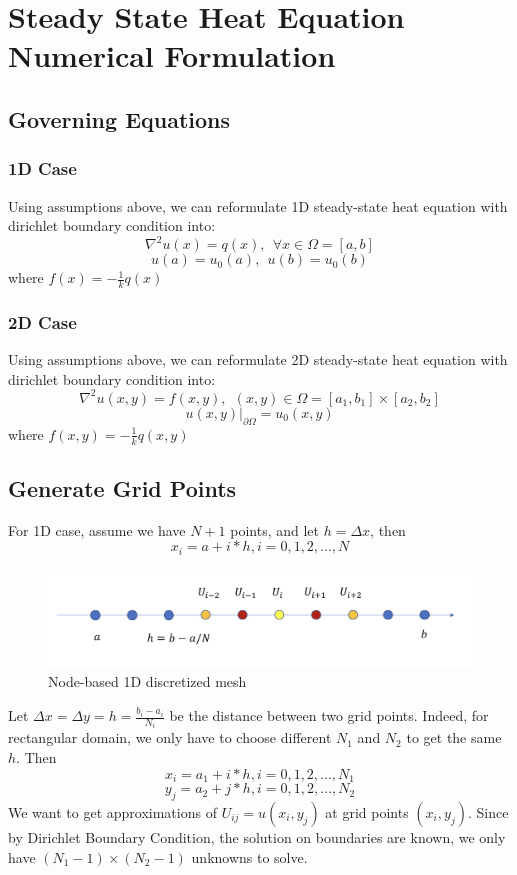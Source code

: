 \documentclass[a4paper]{article}
\begin{document}
\section{Steady State Heat Equation Numerical Formulation}
\subsection{Governing Equations}
\subsubsection{1D Case}
Using assumptions above, we can reformulate 1D steady-state heat equation with dirichlet boundary condition into:
$$\nabla^2u(x) = q(x), ~~\forall x\in \Omega = [a,b]$$
$$u(a) = u_0(a), ~~u(b) = u_0(b) $$
where $f(x) = -\frac{1}{k}q(x)$
\subsubsection{2D Case}
Using assumptions above, we can reformulate 2D steady-state heat equation with dirichlet boundary condition into:
$$\nabla^2u(x,y) = f(x,y), ~~(x,y)\in \Omega = [a_1,b_1] \times [a_2,b_2]$$
$$u(x,y)|_{\partial\Omega} = u_0(x,y)$$
where $f(x,y) = -\frac{1}{k}q(x,y)$

\subsection{Generate Grid Points}
For 1D case, assume we have $N+1$ points, and let $h=\Delta x$, then 
    $$x_i = a + i*h, i = 0,1,2,...,N$$
    
\begin{figure}
\includegraphics[width=1\textwidth]{1d.png}
\caption{\label{1d}Node-based 1D discretized mesh}
\end{figure}

Let $\Delta x = \Delta y = h = \frac{b_i-a_i}{N_i}$ be the distance between two grid points. Indeed, for rectangular domain, we only have to choose different $N_1$ and $N_2$ to get the same $h$. Then
$$x_i = a_1 + i*h, i = 0,1,2,...,N_1$$
$$y_j = a_2 + j*h, i = 0,1,2,...,N_2$$
We want to get approximations of $U_{ij} = u(x_i,y_j)$ at grid points $(x_i, y_j)$. Since by Dirichlet Boundary Condition, the solution on boundaries are known, we only have $(N_1-1)\times (N_2-1)$ unknowns to solve.
\end{document}
